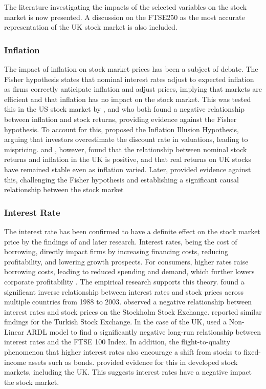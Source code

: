 \documentclass[11pt,a4paper]{article}
\newcommand{\citeboth}[1]{\citeauthor{#1} \citep{#1}}
\begin{document}
The literature investigating the impacts of the selected variables on the stock market is now presented. A discussion on the FTSE250 as the most accurate representation of the UK stock market is also included.

\subsubsection{Inflation}

The impact of inflation on stock market prices has been a subject of debate. The Fisher hypothesis states that nominal interest rates adjust to expected 
inflation as firms correctly anticipate inflation 
and adjust prices, implying that markets are efficient and that inflation has no impact on the stock market. This was tested this in the US stock market by \citeboth{jaffe1976}, and
\citeboth{bodie1976} who both found a negative relationship between inflation and stock returns, providing evidence against the Fisher hypothesis.
To account for this,
\citeboth{mogdiliani1979} proposed the Inflation Illusion Hypothesis, 
arguing that investors overestimate the discount rate in valuations, leading to mispricing. 
\citeboth{gultekin1983} and \citeboth{firth1979}, however, found that the relationship between nominal stock returns and inflation in the UK is positive, and that real returns on UK stocks have remained stable even as inflation varied.
Later, \citeboth{hasan2008} provided evidence against this, challenging the Fisher hypothesis and establishing a 
significant causal relationship between the stock market 


\subsubsection{Interest Rate}

The interest rate has been confirmed to have a definite effect on the 
stock market price by the findings of \citeboth{ChenRollRoss1986} and later research. 
Interest rates, being the cost of borrowing, directly impact firms by increasing financing costs, reducing profitability, and lowering growth prospects. For consumers, higher rates raise borrowing costs, leading to reduced spending and demand, which further lowers corporate profitability \citep{boe199section}. 
The empirical research supports this theory. \citeboth{alam2009} found a significant inverse relationship between interest rates and stock prices across multiple countries from 1988 to 2003.
\citeboth{talla2013} observed a negative relationship between interest rates and stock prices on the Stockholm Stock Exchange.
\citeboth{demir2019} reported similar findings for the Turkish Stock Exchange. In the case of the UK, \citeboth{neifar2023} used a Non-Linear ARDL model to find a significantly negative long-run relationship between interest rates and the FTSE 100 Index. 
In addition, the flight-to-quality phenomenon that higher interest rates also encourage a shift from stocks to fixed-income 
assets such as bonds. \citeboth{asgharian2016} provided evidence for this in developed stock markets, including the UK. This suggests interest rates 
have a negative impact the stock market.
\end{document}
